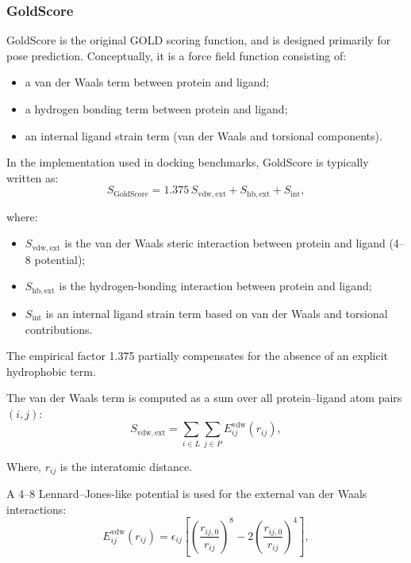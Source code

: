 \documentclass[12pt, a4paper]{article}
\begin{document}
\subsubsection{GoldScore}

GoldScore is the original GOLD scoring function, and is designed primarily for pose prediction.\cite{CH7_Jones1997} Conceptually, it is a force field function consisting of:
\begin{itemize}
    \item a van der Waals term between protein and ligand;
    \item a hydrogen bonding term between protein and ligand;
    \item an internal ligand strain term (van der Waals and torsional components).
\end{itemize}

In the implementation used in docking benchmarks\cite{CH7_Wang2003_Suppl}, GoldScore is typically written as:
\begin{equation}
S_{\mathrm{GoldScore}}
= 1.375\, S_{\mathrm{vdw,ext}}
+ S_{\mathrm{hb,ext}}
+ S_{\mathrm{int}},
\label{eq:GoldScore}
\end{equation}

where:
\begin{itemize}
    \item $S_{\mathrm{vdw,ext}}$ is the van der Waals steric interaction between protein and ligand (4--8 potential);
    \item $S_{\mathrm{hb,ext}}$ is the hydrogen-bonding interaction between protein and ligand;
    \item $S_{\mathrm{int}}$ is an internal ligand strain term based on van der Waals and torsional contributions.
\end{itemize}
The empirical factor 1.375 partially compensates for the absence of an explicit hydrophobic term.\cite{CH7_Wang2003_Suppl}

The van der Waals term is computed as a sum over all protein–ligand atom pairs $(i,j)$:
\begin{equation}
S_{\mathrm{vdw,ext}}
= \sum_{i \in L}\sum_{j \in P}
E^{\mathrm{vdw}}_{ij}(r_{ij}),
\end{equation}

Where,
$r_{ij}$ is the interatomic distance. 

A 4--8 Lennard–Jones-like potential is used for the external van der Waals interactions:
\begin{equation}
E^{\mathrm{vdw}}_{ij}(r_{ij})
= \epsilon_{ij}
\left[
\left(\frac{r_{ij,0}}{r_{ij}}\right)^{8}
-
2\left(\frac{r_{ij,0}}{r_{ij}}\right)^{4}
\right],
\end{equation}
\end{document}
